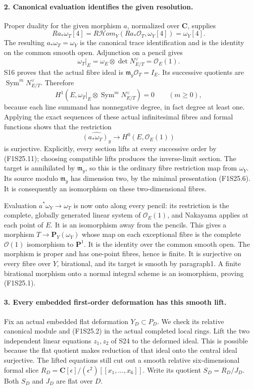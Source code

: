 \paragraph{2. Canonical evaluation identifies the given resolution.}
Proper duality for the given morphism $a$, normalized over
$\mathbf C$, supplies
\[
 Ra_*\omega_T[4]
  =R\mathcal Hom_Y(Ra_*\mathcal O_T,\omega_Y[4])
  =\omega_Y[4].
 \tag{F1S25.9}
\]
The resulting $a_*\omega_T=\omega_Y$ is the canonical trace
identification and is the identity on the common smooth open.
Adjunction on a pencil gives
\[
 \omega_T|_E=\omega_E\otimes\det N_{E/T}^{\vee}
             =\mathcal O_E(1).
 \tag{F1S25.10}
\]
S16 proves that the actual fibre ideal is
$\mathfrak m_y\mathcal O_T=I_E$. Its successive quotients are
$\operatorname{Sym}^mN_{E/T}^{\vee}$. Therefore
\[
 H^1\left(E,\omega_T|_E\otimes
                  \operatorname{Sym}^mN_{E/T}^{\vee}\right)=0
                       \qquad(m\geq0),
 \tag{F1S25.11}
\]
because each line summand has nonnegative degree, in fact degree
at least one. Applying the exact sequences of these actual
infinitesimal fibres and formal functions shows that the restriction
\[
 \widehat{(a_*\omega_T)_y}\longrightarrow
                            H^0(E,\mathcal O_E(1))
 \tag{F1S25.12}
\]
is surjective. Explicitly, every section lifts at every successive
order by (F1S25.11); choosing compatible lifts produces the
inverse-limit section. The target is annihilated by $\mathfrak m_y$,
so this is the ordinary fibre restriction map from $\omega_Y$.
Its source modulo $\mathfrak m_y$ has dimension two, by the
minimal presentation (F1S25.6). It is consequently an isomorphism
on these two-dimensional fibres.

Evaluation $a^*\omega_Y\to\omega_T$ is now onto along every
pencil: its restriction is the complete, globally generated
linear system of $\mathcal O_E(1)$, and Nakayama applies at
each point of $E$. It is an isomorphism away from the pencils.
This gives a morphism
$T\to\mathbf P_Y(\omega_Y)$ whose map on each exceptional
fibre is the complete $\mathcal O(1)$ isomorphism to $\mathbf P^1$.
It is the identity over the common smooth open. The morphism is
proper and has one-point fibres, hence is finite. It is surjective
on every fibre over $Y$, birational, and its target is smooth by
paragraph1. A finite birational morphism onto a normal integral
scheme is an isomorphism, proving (F1S25.1).

\paragraph{3. Every embedded first-order deformation has this smooth lift.}
Fix an actual embedded flat deformation $Y_D\subset P_D$.
We check its relative canonical module and (F1S25.2) in the
actual completed local rings. Lift the two independent linear
equations $z_1,z_2$ of S24 to the deformed ideal. This is possible
because the flat quotient makes reduction of that ideal onto
the central ideal surjective. The lifted equations still cut
out a smooth relative six-dimensional formal slice
$R_D=\mathbf C[\epsilon]/(\epsilon^2)[[x_1,\ldots,x_6]]$.
Write its quotient $S_D=R_D/J_D$. Both $S_D$ and $J_D$ are
flat over $D$.

